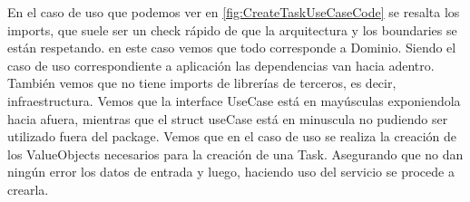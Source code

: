 En el caso de uso que podemos ver en \ref{fig:CreateTaskUseCaseCode} se resalta los imports, que suele ser un check rápido de que la arquitectura y los boundaries se están respetando. en este caso vemos que todo corresponde a Dominio. Siendo el caso de uso correspondiente a aplicación las dependencias van hacia adentro. También vemos que no tiene imports de librerías de terceros, es decir, infraestructura. Vemos que la interface UseCase está en mayúsculas exponiendola hacia afuera, mientras que el struct useCase está en minuscula no pudiendo ser utilizado fuera del package. Vemos que en el caso de uso se realiza la creación de los ValueObjects necesarios para la creación de una Task. Asegurando que no dan ningún error los datos de entrada y luego, haciendo uso del servicio se procede a crearla.

\begin{figure}[H]
    \centering

\end{figure}
